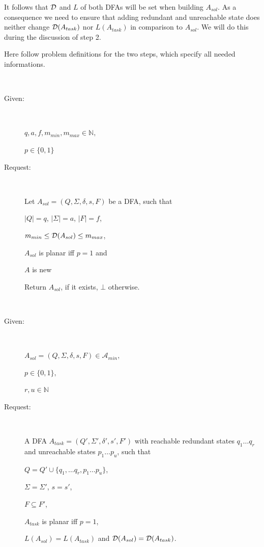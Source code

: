 It follows that $\mathcal{D}$ and $L$ of both DFAs will be set when building $A_{sol}$. As a consequence we need to ensure that adding redundant and unreachable state does neither change $\mathcal{D}(A_{task})$ nor $L(A_{task})$ in comparison to $A_{sol}$. We will do this during the discussion of step 2.

Here follow problem definitions for the two steps, which specify all needed informations.  %

\begin{definition}[BuildNewMinimalDFA] \label{ch:1:def:BuildNewMinimalDFA} $ $
	\begin{description}
		
		\item[Given:] $ $
		
		$q, a, f, m_{min}, m_{max} \in \mathbb{N},$
		
		$p \in \{0,1\}$
		\item[Request:] $ $
		
		Let $A_{sol} = (Q, \Sigma, \delta, s, F)$ be a DFA, such that
		
		\qquad $|Q|=q$, $|\Sigma|=a$, $|F|=f$,
		
		\qquad $m_{min} \le \mathcal{D}(A_{sol}) \le m_{max}$,
		
		\qquad $A_{sol}$ is planar iff $p = 1$ and
		
		\qquad $A$ is new
		
		Return $A_{sol}$, if it exists, $\bot$ otherwise.
	\end{description}
\end{definition}

\begin{definition}[ExtendMinimalDFA] \label{ch:1:def:ExtendMinimalDFA} $ $
	\begin{description}
		
		\item[Given:] $ $
		
		$A_{sol} = (Q, \Sigma, \delta, s, F) \in \mathcal{A}_{min},$
		
		$p \in \{0,1\},$
		
		$r, u \in \mathbb{N}$
		\item[Request:] $ $
		
		A DFA $A_{task} = (Q', \Sigma', \delta', s', F')$ with reachable redundant states $q_1 \ldots q_r$ and unreachable states $p_1 \ldots p_u$, such that
		
		$Q = Q' \cup \{ q_1, \ldots q_r, p_1 \ldots p_u \}$,
		
		$\Sigma = \Sigma'$, $s = s'$,
		
		$F \subseteq F'$,
		
		$A_{task}$ is planar iff $p = 1$,
		
		$L(A_{sol}) = L(A_{task})$ and $\mathcal{D}(A_{sol}) = \mathcal{D}(A_{task})$.
	\end{description}
\end{definition}

